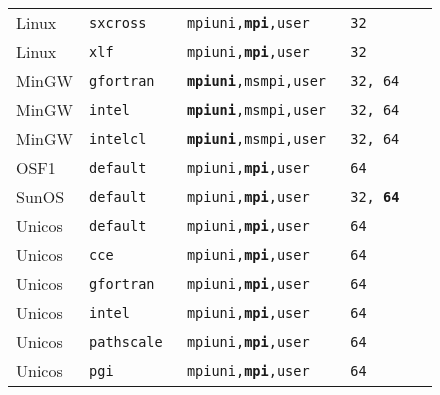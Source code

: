 \begin{longtable}{lllll}
Linux   &\tt sxcross     &\footnotesize \tt mpiuni,{\bf mpi},user      &\tt 32  \\
Linux   &\tt xlf         &\footnotesize \tt mpiuni,{\bf mpi},user      &\tt 32  \\
MinGW   &\tt gfortran    &\footnotesize \tt {\bf mpiuni},msmpi,user    &\tt 32, 64 \\
MinGW   &\tt intel       &\footnotesize \tt {\bf mpiuni},msmpi,user    &\tt 32, 64 \\
MinGW   &\tt intelcl     &\footnotesize \tt {\bf mpiuni},msmpi,user    &\tt 32, 64 \\
OSF1    &\tt default     &\footnotesize \tt mpiuni,{\bf mpi},user      &\tt 64  \\
SunOS   &\tt default     &\footnotesize \tt mpiuni,{\bf mpi},user      &\tt 32, {\bf 64} \\
Unicos  &\tt default     &\footnotesize \tt mpiuni,{\bf mpi},user      &\tt 64  \\
Unicos  &\tt cce         &\footnotesize \tt mpiuni,{\bf mpi},user      &\tt 64  \\
Unicos  &\tt gfortran    &\footnotesize \tt mpiuni,{\bf mpi},user      &\tt 64  \\
Unicos  &\tt intel       &\footnotesize \tt mpiuni,{\bf mpi},user      &\tt 64  \\
Unicos  &\tt pathscale   &\footnotesize \tt mpiuni,{\bf mpi},user      &\tt 64  \\
Unicos  &\tt pgi         &\footnotesize \tt mpiuni,{\bf mpi},user      &\tt 64

\end{longtable}

\vspace{1ex}


